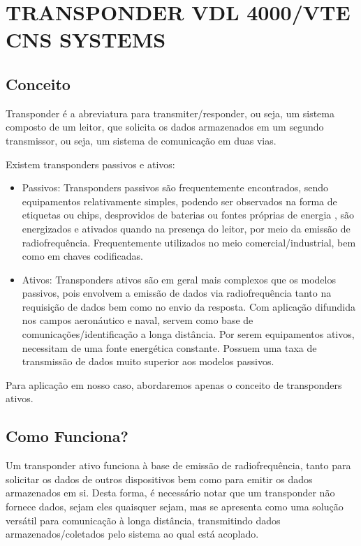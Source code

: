 \chapter[TRANSPONDER VDL 4000/VTE CNS SYSTEMS]{TRANSPONDER VDL 4000/VTE CNS SYSTEMS}


\section{Conceito}
Transponder é a abreviatura para transmiter/responder, ou seja, um sistema
composto de um leitor, que solicita os dados armazenados em um segundo
transmissor, ou seja, um sistema de comunicação em duas vias.

Existem transponders passivos e ativos:

\begin{itemize}
  \item Passivos: Transponders passivos são frequentemente encontrados,
  sendo equipamentos relativamente simples, podendo ser observados na forma
  de etiquetas ou chips, desprovidos de baterias ou fontes próprias de energia
  , são energizados e ativados quando na presença do leitor, por meio da
   emissão de radiofrequência. Frequentemente utilizados no meio
   comercial/industrial, bem como em chaves codificadas.
  \item Ativos: Transponders ativos são em geral mais complexos que os
  modelos passivos, pois envolvem a emissão de dados via radiofrequência
  tanto na requisição de dados bem como no envio da resposta. Com aplicação
  difundida nos campos aeronáutico e naval, servem como base de
  comunicações/identificação a longa distância. Por serem equipamentos ativos,
  necessitam de uma fonte energética constante. Possuem uma taxa de
  transmissão de dados muito superior aos modelos passivos.
\end{itemize}

Para aplicação em nosso caso, abordaremos apenas o conceito de transponders ativos.

\section{Como Funciona?}
Um transponder ativo funciona à base de emissão de radiofrequência, tanto para
solicitar os dados de outros dispositivos bem como para emitir os dados
armazenados em si. Desta forma, é necessário notar que um transponder não
fornece dados, sejam eles quaisquer sejam, mas se apresenta como uma solução
versátil para comunicação à longa distância, transmitindo dados
armazenados/coletados pelo sistema ao qual está acoplado.

